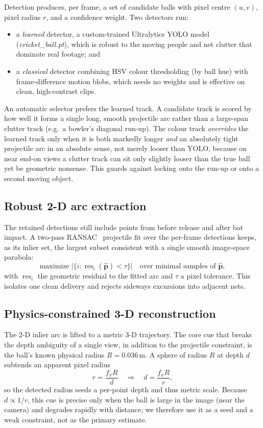 \documentclass[journal]{IEEEtran}
\begin{document}
Detection produces, per frame, a set of candidate balls with pixel centre
$(u,v)$, pixel radius $r$, and a confidence weight. Two detectors run:
\begin{itemize}
\item a \emph{learned} detector, a custom-trained Ultralytics YOLO model
(\emph{cricket\_ball.pt}), which is robust to the moving people and net
clutter that dominate real footage; and
\item a \emph{classical} detector combining HSV colour thresholding (by ball
hue) with frame-difference motion blobs, which needs no weights and is effective
on clean, high-contrast clips.
\end{itemize}
An automatic selector prefers the learned track. A candidate track is scored by
how well it forms a single long, smooth projectile arc rather than a
large-span clutter track (e.g.\ a bowler's diagonal run-up). The colour track
\emph{overrides} the learned track only when it is both markedly longer
\emph{and} an absolutely tight projectile arc in an absolute sense, not merely
looser than YOLO, because on near end-on views a clutter track can sit only
slightly looser than the true ball yet be geometric nonsense. This guards
against locking onto the run-up or onto a second moving object.

\subsection{Robust 2-D arc extraction}
The retained detections still include points from before release and after bat
impact. A two-pass RANSAC~\cite{fischler1981ransac} projectile fit over the
per-frame detections keeps, as its inlier set, the largest subset consistent
with a single smooth image-space parabola:
\begin{equation}
\text{maximize}\;\bigl|\{i: \operatorname{res}_i(\hat{\mathbf p})<\tau\}\bigr|
\quad\text{over minimal samples of }\hat{\mathbf p},
\end{equation}
with $\operatorname{res}_i$ the geometric residual to the fitted arc and $\tau$
a pixel tolerance. This isolates one clean delivery and rejects sideways
excursions into adjacent nets.

\subsection{Physics-constrained 3-D reconstruction}
\label{sec:recon}

The 2-D inlier arc is lifted to a metric 3-D trajectory. The core cue that
breaks the depth ambiguity of a single view, in addition to the projectile
constraint, is the ball's known physical radius $R=0.036$\,m. A sphere of radius
$R$ at depth $d$ subtends an apparent pixel radius
\begin{equation}
r=\frac{f_x R}{d}\quad\Longrightarrow\quad d=\frac{f_x R}{r},
\label{eq:depthsize}
\end{equation}
so the detected radius seeds a per-point depth and thus metric scale. Because
$d\propto 1/r$, this cue is precise only when the ball is large in the image
(near the camera) and degrades rapidly with distance; we therefore use it as a
seed and a weak constraint, not as the primary estimate.
\end{document}
